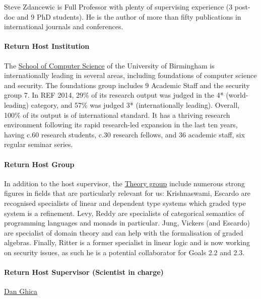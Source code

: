 \documentclass{article}[11pt]
\begin{document}
Steve Zdancewic %
is Full Professor with plenty of supervising experience (3 post-doc and 9 PhD students). He is the author of more than fifty publications in international journals and conferences.


\paragraph{Return Host Institution}
The \href{http://www.cs.bham.ac.uk/}{School of Computer Science} of the University of Birmingham is
internationally leading in several areas, including foundations of
computer science and security. The foundations group includes 9
Academic Staff and the security group 7. In REF 2014, 29\% of its
research output was judged in the 4* (world-leading) category, and
57\% was judged 3* (internationally leading). Overall, 100\% of its
output is of international standard. It has a thriving research
environment following its rapid research-led expansion in the last ten
years, having c.60 research students, c.30 research fellows, and 36
academic staff, six regular seminar series.


\paragraph{Return Host Group}
In addition to the host supervisor, the \href{http://www.cs.bham.ac.uk/research/groupings/theory/}{Theory group} include numerous strong figures in fields that are particularly relevant for us: Krishnaswami, Escardo are recognised specialists of linear and dependent type systems which graded type system is a refinement. Levy, Reddy are specialists of categorical semantics of programming languages and monads in particular. Jung, Vickers (and Escardo) are specialist of domain theory and can help with the formalisation of graded algebras. Finally,  Ritter is a former specialist in linear logic and is now working on security issues, as such he is a potential collaborator for Goals 2.2 and 2.3. 

\paragraph{Return Host Supervisor (Scientist in charge)}
\href{http://www.cs.bham.ac.uk/~drg/}{Dan Ghica} 
\end{document}

